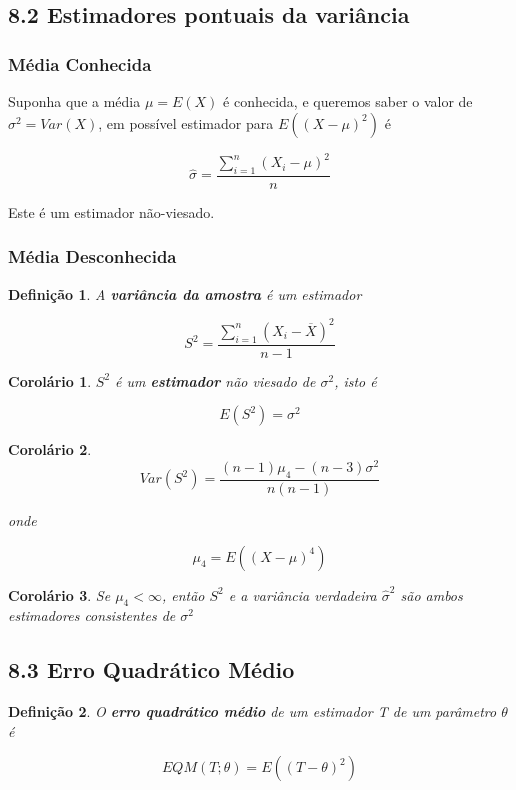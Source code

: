 \documentclass[12pt]{article}
\newtheorem{corollary}{Corolário}[theorem]
\newtheorem{definition}{Definição}
\begin{document}
\subsection*{8.2 Estimadores pontuais da variância}
\subsubsection*{Média Conhecida}
Suponha que a média $\mu = E(X)$ é conhecida, e queremos saber o valor de $\sigma^2 = Var(X)$, em possível estimador para $E((X - \mu)^2)$ é

$$\hat{\sigma} = \frac{\sum_{i = 1}^{n} (X_i - \mu)^2}{n}$$

Este é um estimador não-viesado.

\subsubsection*{Média Desconhecida}
\begin{definition}
    A \textbf{variância da amostra} é um estimador
    
    $$S^2 = \frac{\sum_{i = 1}^n (X_i - \overline{X})^2}{n - 1}$$
\end{definition}

\begin{corollary}
    $S^2$ é um \textbf{estimador} não viesado de $\sigma^2$, isto é
    
    $$E(S^2) = \sigma^2$$
\end{corollary}

\begin{corollary}
    $$Var(S^2) = \frac{(n-1) \mu_4 - (n-3) \sigma^2}{n (n-1)}$$
    
    onde
    
    $$\mu_4 = E((X - \mu)^4)$$
\end{corollary}

\begin{corollary}
    Se $\mu_4 < \infty$, então $S^2$ e a variância verdadeira $\hat{\sigma}^2$ são ambos estimadores consistentes de $\sigma^2$
\end{corollary}

\subsection*{8.3 Erro Quadrático Médio}
\begin{definition}
    O \textbf{erro quadrático médio} de um estimador T de um parâmetro $\theta$ é
    
    $$EQM(T;\theta) = E((T - \theta)^2)$$
\end{definition}
\end{document}
